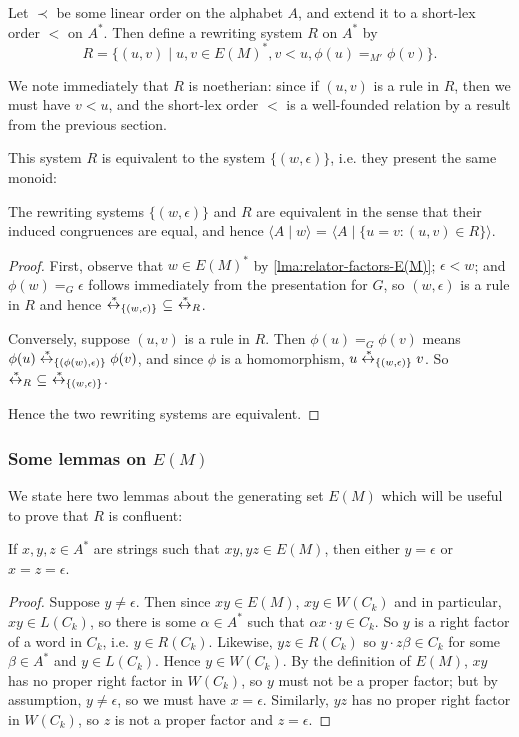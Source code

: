 \documentclass[noindex,noinsetproof,12pt]{lmaths}
\newcommand{\leftrightst}{\mathrel{\smash{\stackrel{\hspace{0.1em}\ast}{\leftrightarrow}}}}
\begin{document}
Let $\prec$ be some linear order on the alphabet $A$, and extend it to a short-lex order $<$ on $A^*$. Then define a rewriting system $R$ on $A^*$ by
	\[ R = \{ (u, v) \mid u, v \in E(M)^*, v < u, \phi(u) =_{M'} \phi(v) \}. \]

We note immediately that $R$ is noetherian: since if $(u, v)$ is a rule in $R$, then we must have $v < u$, and the short-lex order $<$ is a well-founded relation by a result from the previous section.

This system $R$ is equivalent to the system $\{(w, \epsilon)\}$, i.e. they present the same monoid:
\begin{lemma} \label{lma:R-equivalent-to-pres}
	The rewriting systems $\{(w, \epsilon)\}$ and $R$ are equivalent in the sense that their induced congruences  are equal, and hence $\langle A \mid w \rangle$ = $\langle A \mid \{u = v : (u, v) \in R\}\rangle$.
\end{lemma}
\begin{proof}
	First, observe that $w \in E(M)^*$ by \cref{lma:relator-factors-E(M)}; $\epsilon < w$; and $\phi(w) =_G \epsilon$ follows immediately from the presentation for $G$, so $(w, \epsilon)$ is a rule in $R$ and hence $\leftrightst_{\{(w,\epsilon)\}}\ \subseteq\ \leftrightst_R$.

Conversely, suppose $(u, v)$ is a rule in $R$. Then $\phi(u) =_G \phi(v)$ means $\phi(u) \leftrightst_{\{(\phi(w), \epsilon)\}} \phi(v)$, and since $\phi$ is a homomorphism, $u \leftrightst_{\{(w, \epsilon)\}} v$. So $\leftrightst_R\ \subseteq\ \leftrightst_{\{(w,\epsilon)\}}$.

Hence the two rewriting systems are equivalent.
\end{proof}


\subsubsection{\texorpdfstring{Some lemmas on $E(M)$}{Some lemmas on E(M)}}

We state here two lemmas about the generating set $E(M)$ which will be useful to prove that $R$ is confluent:

\begin{lemma} \label{lma:no-middle-E(M)}
	If $x, y, z \in A^*$ are strings such that $xy, yz \in E(M)$, then either $y = \epsilon$ or $x = z = \epsilon$.
\end{lemma}
\begin{proof}
	Suppose $y \ne \epsilon$. Then since $xy \in E(M)$, $xy \in W(C_k)$ and in particular, $xy \in L(C_k)$, so there is some $\alpha \in A^*$ such that $\alpha x \cdot y \in C_k$. So $y$ is a right factor of a word in $C_k$, i.e. $y \in R(C_k)$. Likewise, $yz \in R(C_k)$ so $y \cdot z\beta \in C_k$ for some $\beta \in A^*$ and $y \in L(C_k)$. Hence $y \in W(C_k)$. By the definition of $E(M)$, $xy$ has no proper right factor in $W(C_k)$, so $y$ must not be a proper factor; but by assumption, $y \ne \epsilon$, so we must have $x = \epsilon$. Similarly, $yz$ has no proper right factor in $W(C_k)$, so $z$ is not a proper factor and $z = \epsilon$.
\end{proof}
\end{document}
